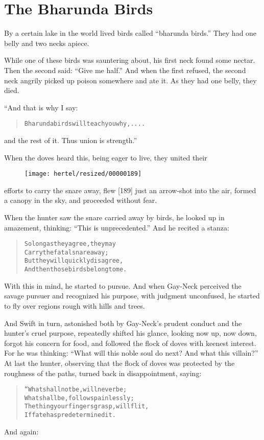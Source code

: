 \documentclass[article, twoside, 10pt]{memoir}
\renewenvironment{verbatim}{%
\begin{quote}%
\vskip -10pt%
\begin{alltt}\normalfont\small}{\end{alltt}%
\end{quote}%
\vskip -10pt
} %
\begin{document}
\chapter{The Bharunda Birds}

By a certain lake in the world lived birds called
``bharunda birds.'' They had one belly and two necks apiece.

While one of these birds was sauntering about, his first neck found
some nectar. Then the second said: ``Give me half.'' And when the
first refused, the second neck angrily picked up poison somewhere
and ate it. As they had one belly, they died.

“And that is why I say:

\begin{verbatim}
    Bharunda birds will teach you why, ....
\end{verbatim}
and the rest of it. Thus union is strength.”

When the doves heard this, being eager to live, they united their
\begin{figure}[p]\texttt{[image: hertel/resized/00000189]}\end{figure}efforts to carry the snare away, flew [189] just an arrow-shot into
the air, formed a canopy in the sky, and proceeded without fear.

When the hunter saw the snare carried away by birds, he looked up
in amazement, thinking: ``This is unprecedented.'' And he recited a
stanza:

\begin{verbatim}
So long as they agree, they may
Carry the fatal snare away;
But they will quickly disagree,
And then those birds belong to me.
\end{verbatim}
With this in mind, he started to pursue. And when Gay-Neck
perceived the savage pursuer and recognized his purpose, with
judgment unconfused, he started to fly over regions rough with
hills and trees.

And Swift in turn, astonished both by Gay-Neck's prudent conduct
and the hunter's cruel purpose, repeatedly shifted his glance,
looking now up, now down, forgot his concern for food, and followed
the flock of doves with keenest interest. For he was thinking:
``What will this noble soul do next? And what this villain?'' At
last the hunter, observing that the flock of doves was protected by
the roughness of the paths, turned back in disappointment, saying:

\begin{verbatim}
“What shall not be, will never be;
What shall be, follows painlessly;
The thing your fingers grasp, will flit,
If fate has predetermined it.
\end{verbatim}
And again:
\end{document}
